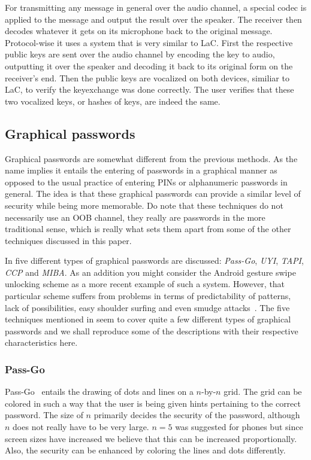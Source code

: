\documentclass[conference, 11pt]{sty/IEEEtran}
\begin{document}
For transmitting any message in general over the audio channel, a special codec is applied to the message and output the result over the speaker.
The receiver then decodes whatever it gets on its microphone back to the original message.
Protocol-wise it uses a system that is very similar to LaC.
First the respective public keys are sent over the audio channel by encoding the key to audio, outputting it over the speaker and decoding it back to its original form on the receiver's end.
Then the public keys are vocalized on both devices, similiar to LaC, to verify the keyexchange was done correctly.
The user verifies that these two vocalized keys, or hashes of keys, are indeed the same.

\subsection{Graphical passwords}
\label{ssec:graphical_passwords}

Graphical passwords are somewhat different from the previous methods.
As the name implies it entails the entering of passwords in a graphical manner as opposed to the usual practice of entering PINs or alphanumeric passwords in general.
The idea is that these graphical passwords can provide a similar level of security while being more memorable.
Do note that these techniques do not necessarily use an OOB channel, they really are passwords in the more traditional sense, which is really what sets them apart from some of the other techniques discussed in this paper.

In \cite{schaub2013exploring} five different types of graphical passwords are discussed: \emph{Pass-Go}, \emph{UYI}, \emph{TAPI}, \emph{CCP} and \emph{MIBA}.
As an addition you might consider the Android gesture swipe unlocking scheme as a more recent example of such a system.
However, that particular scheme suffers from problems in terms of predictability of patterns, lack of possibilities, easy shoulder surfing and even smudge attacks~\cite{aviv2010smudge}.
The five techniques mentioned in \cite{schaub2013exploring} seem to cover quite a few different types of graphical passwords and we shall reproduce some of the descriptions with their respective characteristics here.

\subsubsection{Pass-Go}
\label{sssec:pass_go}

Pass-Go~\cite{tao2008pass} entails the drawing of dots and lines on a $n$-by-$n$ grid.
The grid can be colored in such a way that the user is being given hints pertaining to the correct password.
The size of $n$ primarily decides the security of the password, although $n$ does not really have to be very large.
$n = 5$ was suggested for phones but since screen sizes have increased we believe that this can be increased proportionally.
Also, the security can be enhanced by coloring the lines and dots differently.
\end{document}
